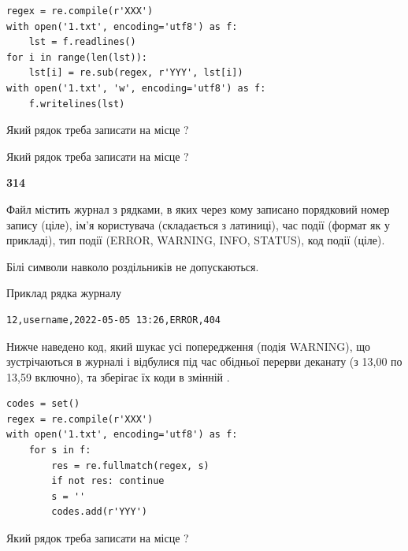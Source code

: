 \begin{verbatim}
regex = re.compile(r'XXX')
with open('1.txt', encoding='utf8') as f:
    lst = f.readlines()
for i in range(len(lst)):
    lst[i] = re.sub(regex, r'YYY', lst[i])
with open('1.txt', 'w', encoding='utf8') as f:
    f.writelines(lst)
\end{verbatim}







Який рядок треба записати на місце  ?\par
\vspace{5mm}


Який рядок треба записати на місце  ?\par


\newpage

{\begin {center}\textbf{ 314}\end {center}}\par
Файл  містить журнал з рядками, в яких через кому записано поряд\-ко\-вий номер запису (ціле), ім'я користувача (складається з латиниці), час події (фор\-мат як у прикладі), тип події (ERROR, WARNING, INFO, STATUS), код події (ціле).

Білі символи навколо роздільників не допускаються.

Приклад рядка журналу



\begin{verbatim}
12,username,2022-05-05 13:26,ERROR,404
\end{verbatim}


Нижче наведено код, який шукає усі попередження (подія WARNING), що зустрі\-ча\-ються в журналі і відбулися під час обідньої перерви деканату (з 13,00 по 13,59 включно), та зберігає їх коди в змінній .



\begin{verbatim}
codes = set()
regex = re.compile(r'XXX')
with open('1.txt', encoding='utf8') as f:
    for s in f:
        res = re.fullmatch(regex, s)
        if not res: continue
        s = ''
        codes.add(r'YYY')
\end{verbatim}







Який рядок треба записати на місце  ?\par
\vspace{5mm}


